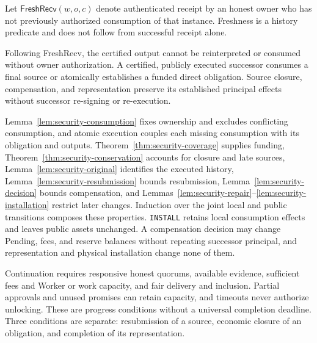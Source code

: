Let $\mathsf{FreshRecv}(w,o,c)$ denote authenticated receipt by an honest owner who has not previously authorized consumption of that instance. Freshness is a history predicate and does not follow from successful receipt alone.

\begin{theorem}
\label{thm:security-continuation}
Following FreshRecv, the certified output cannot be reinterpreted or
consumed without owner authorization. A certified, publicly executed
successor consumes a final source or atomically establishes a funded
direct obligation. Source closure, compensation, and representation
preserve its established principal effects without successor re-signing
or re-execution.
\end{theorem}
\begin{IEEEproof}
Lemma~\ref{lem:security-consumption} fixes ownership and excludes conflicting consumption, and atomic execution couples each missing consumption with its obligation and outputs. Theorem~\ref{thm:security-coverage} supplies funding, Theorem~\ref{thm:security-conservation} accounts for closure and late sources, Lemma~\ref{lem:security-original} identifies the executed history, Lemma~\ref{lem:security-resubmission} bounds resubmission, Lemma~\ref{lem:security-decision} bounds compensation, and Lemmas~\ref{lem:security-repair}--\ref{lem:security-installation} restrict later changes. Induction over the joint local and public transitions composes these properties. \texttt{INSTALL} retains local consumption effects and leaves public assets unchanged. A compensation decision may change Pending, fees, and reserve balances without repeating successor principal, and representation and physical installation change none of them.
\end{IEEEproof}

Continuation requires responsive honest quorums, available evidence, sufficient fees and Worker or work capacity, and fair delivery and inclusion. Partial approvals and unused promises can retain capacity, and timeouts never authorize unlocking. These are progress conditions without a universal completion deadline. Three conditions are separate: resubmission of a source, economic closure of an obligation, and completion of its representation.

